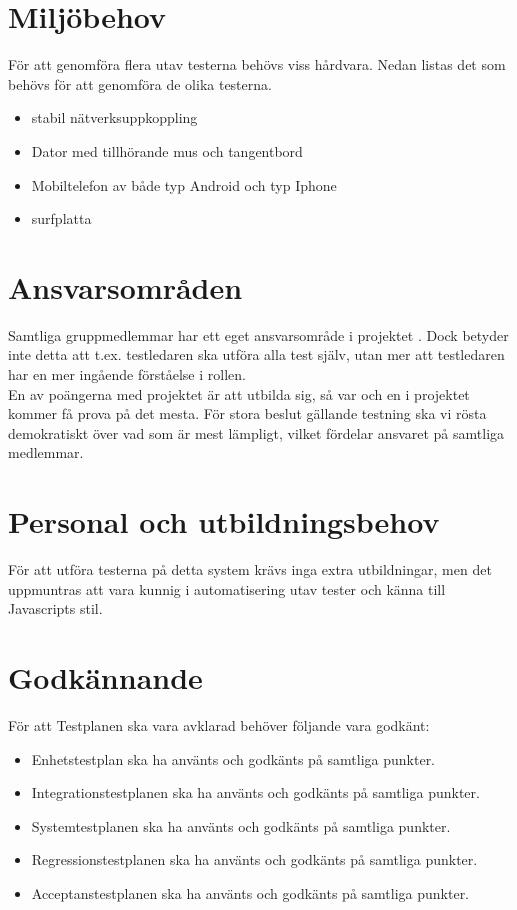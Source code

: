 \documentclass[10pt]{article}
\begin{document}
	

\section{Miljöbehov}
	För att genomföra flera utav testerna behövs viss hårdvara. Nedan listas det som behövs för att genomföra de olika testerna. 

	\begin{itemize}
	\item stabil nätverksuppkoppling
	\item Dator med tillhörande mus och tangentbord
	\item Mobiltelefon av både typ Android och typ Iphone 
	\item surfplatta
	\end{itemize}

\section{Ansvarsområden}
	Samtliga gruppmedlemmar har ett eget ansvarsområde i projektet \cite{bib-projektplan}. Dock betyder inte detta att t.ex. testledaren ska utföra alla test själv, utan mer att testledaren har en mer ingående förståelse i rollen. \\
	En av poängerna med projektet är att utbilda sig, så var och en i projektet kommer få prova på det mesta. För stora beslut gällande testning ska vi rösta demokratiskt över vad som är mest lämpligt, vilket fördelar ansvaret på samtliga medlemmar.
	

\section{Personal och utbildningsbehov}
	För att utföra testerna på detta system krävs inga extra utbildningar, men det uppmuntras att vara kunnig i automatisering utav tester och känna till Javascripts stil.

	
	
\section{Godkännande}
	För att Testplanen ska vara avklarad behöver följande vara godkänt:
	\begin{itemize}
	 \item Enhetstestplan ska ha använts och godkänts på samtliga punkter.
	 \item Integrationstestplanen ska ha använts och godkänts på samtliga punkter.
	 \item Systemtestplanen ska ha använts och godkänts på samtliga punkter.
	 \item Regressionstestplanen ska ha använts och godkänts på samtliga punkter.
	 \item Acceptanstestplanen ska ha använts och godkänts på samtliga punkter.
	\end{itemize}
	
\printbibliography	
\end{document}
